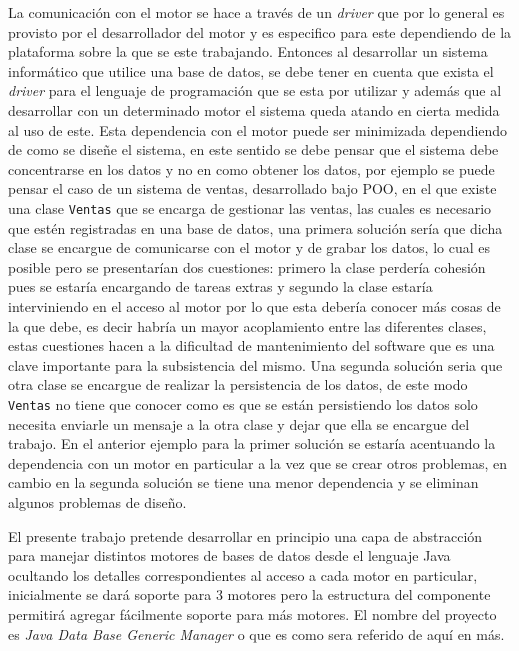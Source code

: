 La comunicación con el motor se hace a través de un \textit{driver} que por lo general es provisto por el desarrollador del motor y es especifico para este dependiendo de la plataforma sobre la que se este trabajando. Entonces al desarrollar un sistema informático que utilice una base de datos,  se debe tener en cuenta que exista el \textit{driver} para el lenguaje de programación que se esta por utilizar y además que al desarrollar con un determinado motor el sistema queda atando en cierta medida al uso de este. Esta dependencia con el motor puede ser minimizada dependiendo de como se diseñe el sistema, en este sentido se debe pensar que el sistema debe concentrarse en los datos y no en como obtener los datos, por ejemplo se puede pensar el caso de un sistema de ventas, desarrollado bajo POO, en el que existe una clase \verb=Ventas= que se encarga de gestionar las ventas, las cuales es necesario que estén registradas en una base de datos, una primera solución sería que dicha clase se encargue de comunicarse con el motor y de grabar los datos, lo cual es posible pero se presentarían dos cuestiones: primero la clase perdería cohesión pues se estaría encargando de tareas extras y segundo la clase estaría interviniendo en el acceso al motor por lo que esta debería conocer más cosas de la que debe, es decir habría un mayor acoplamiento entre las diferentes clases, estas cuestiones hacen a la dificultad de mantenimiento del software que es una clave importante para la subsistencia del mismo. Una segunda solución seria que otra clase se encargue de realizar la persistencia de los datos, de este modo \verb=Ventas= no tiene que conocer como es que se están persistiendo los datos solo necesita enviarle un mensaje a la otra clase y dejar que ella se encargue del trabajo. En el anterior ejemplo para la primer solución se estaría acentuando la dependencia con un motor en particular a la vez que se crear otros problemas, en cambio en la segunda solución se tiene una menor dependencia y se eliminan algunos problemas de diseño.

El presente trabajo pretende desarrollar en principio una capa de abstracción para manejar distintos motores de bases de datos desde el lenguaje Java ocultando los detalles correspondientes al acceso a cada motor en particular, inicialmente se dará soporte para 3 motores pero  la estructura del componente permitirá agregar fácilmente soporte para más motores. El nombre del proyecto es \textit{Java Data Base Generic Manager} o \jj que es como sera referido de aquí en más.
%
%
